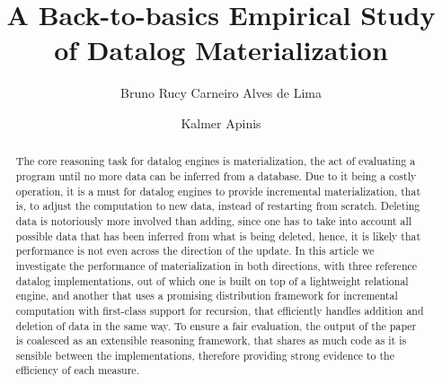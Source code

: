 \documentclass[manuscript,screen,review]{acmart}
\theoremstyle{definition}
\begin{document}
\title{A Back-to-basics Empirical Study of Datalog Materialization}

\author{Bruno Rucy Carneiro Alves de Lima}

\author{Kalmer Apinis}

\renewcommand{\shortauthors}{Trovato and Tobin, et al.}

\begin{abstract}
	The core reasoning task for datalog engines is materialization, the
	act of evaluating a program until no more data can be inferred from
	a database. Due to it being a costly operation, it is a must for datalog
	engines to provide incremental materialization, that is, to adjust the
	computation to new data, instead of restarting from scratch. Deleting data
	is notoriously more involved than adding, since one has to take into account
	all possible data that has been inferred from what is being deleted, hence, it is
	likely that performance is not even across the direction of the update. In this
	article we investigate the performance of materialization in both directions, with
	three reference datalog implementations, out of which one is built on top of a
	lightweight relational engine, and another that uses a promising distribution framework
	for incremental computation with first-class support for recursion, that efficiently
	handles addition and deletion of data in the same way. To ensure a fair evaluation, the
	output of the paper is coalesced as an extensible reasoning framework, that shares
	as much code as it is sensible between the implementations, therefore providing strong
	evidence to the efficiency of each measure.
\end{abstract}
\end{document}
